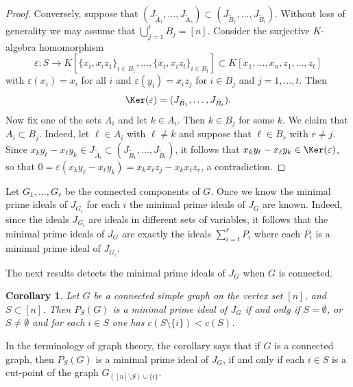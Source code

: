 \documentclass[11pt]{amsart}
\let\union=\cup
\let\Union=\bigcup
\let\to=\rightarrow
\let\:=\colon
\newtheorem{Corollary}[Theorem]{Corollary}
\let\epsilon\varepsilon
\begin{document}
\begin{proof}
Conversely, suppose that $(J_{\tilde{A}_1},\ldots, J_{\tilde{A}_s})\subset (J_{\tilde{B}_1},\ldots, J_{\tilde{B}_t})$. Without loss of generality we may assume that $\Union_{j=1}^tB_j=[n]$. Consider the surjective $K$-algebra homomorphism
\[
\epsilon\: S\to K[\{x_i,x_iz_1\}_{i\in B_1},\ldots, \{x_i,x_iz_t\}_{i\in B_t}]\subset K[x_1,\ldots,x_n,z_1,\ldots,z_t]
\]
with $\epsilon(x_i) =x_i$ for all $i$ and $\epsilon(y_i)=x_iz_j$  for $i\in B_j$ and $j=1,\ldots,t$. Then
\[
\Ker(\epsilon)=(J_{\tilde{B}_1},\ldots, J_{\tilde{B}_t}).
\]
Now fix one of the sets $A_i$ and let $k\in A_i$. Then $k\in B_j$ for some $k$. We claim that $A_i\subset B_j$. Indeed, let $\ell\in A_i$ with $\ell\neq k$ and suppose that $\ell\in B_r$ with $r\neq j$. Since $x_ky_\ell-x_\ell y_k\in J_{\tilde{A}_i}\subset (J_{\tilde{B}_1},\ldots, J_{\tilde{B}_t})$, it follows that $x_ky_\ell-x_\ell y_k\in \Ker(\epsilon)$, so that $0=\epsilon(x_ky_\ell-x_\ell y_k)=x_kx_\ell z_j-x_kx_\ell z_r$, a contradiction.
\end{proof}

Let $G_1,\ldots,G_r$ be the connected components of $G$.
Once we know the minimal prime ideals of $J_{G_i}$ for each $i$ the minimal prime ideals of $J_G$ are known. Indeed, since the ideals $J_{G_i}$ are ideals in different sets of variables, it follows that the minimal prime ideals of $J_G$ are exactly the ideals $\sum_{i=t}^rP_i$ where each $P_i$ is a minimal prime ideal of $J_{G_i}$.

The next results detects the minimal prime ideals of $J_G$ when $G$ is connected.




\begin{Corollary}
\label{minimalprime}
Let $G$ be a connected simple graph on the vertex set $[n]$, and $S\subset [n]$. Then $P_S(G)$ is a minimal prime ideal of $J_G$ if and only if $S=\emptyset$, or $S\neq\emptyset$ and for each $i\in S$ one has $c(S\setminus \{i\})<c(S)$.
\end{Corollary}

In the terminology of graph theory, the corollary says that if $G$ is a connected graph, then $P_S(G)$ is a minimal prime ideal of $J_G$, if and only if each $i\in S$ is a cut-point of the graph $G_{([n]\setminus S)\union\{i\}}$.
\end{document}
